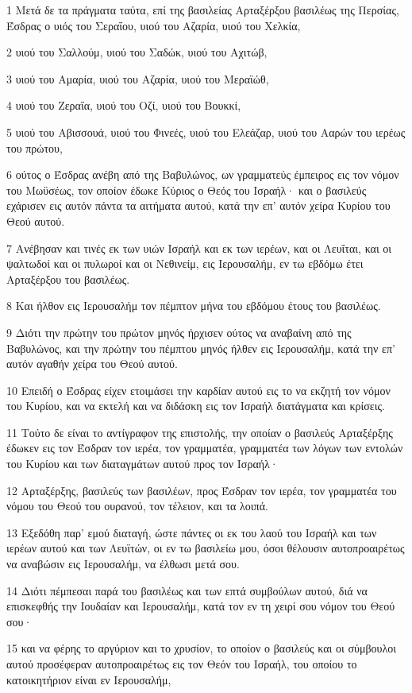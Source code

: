\par 1 Μετά δε τα πράγματα ταύτα, επί της βασιλείας Αρταξέρξου βασιλέως της Περσίας, Έσδρας ο υιός του Σεραΐου, υιού του Αζαρία, υιού του Χελκία,
\par 2 υιού του Σαλλούμ, υιού του Σαδώκ, υιού του Αχιτώβ,
\par 3 υιού του Αμαρία, υιού του Αζαρία, υιού του Μεραϊώθ,
\par 4 υιού του Ζεραΐα, υιού του Οζί, υιού του Βουκκί,
\par 5 υιού του Αβισσουά, υιού του Φινεές, υιού του Ελεάζαρ, υιού του Ααρών του ιερέως του πρώτου,
\par 6 ούτος ο Έσδρας ανέβη από της Βαβυλώνος, ων γραμματεύς έμπειρος εις τον νόμον του Μωϋσέως, τον οποίον έδωκε Κύριος ο Θεός του Ισραήλ· και ο βασιλεύς εχάρισεν εις αυτόν πάντα τα αιτήματα αυτού, κατά την επ' αυτόν χείρα Κυρίου του Θεού αυτού.
\par 7 Ανέβησαν και τινές εκ των υιών Ισραήλ και εκ των ιερέων, και οι Λευΐται, και οι ψαλτωδοί και οι πυλωροί και οι Νεθινείμ, εις Ιερουσαλήμ, εν τω εβδόμω έτει Αρταξέρξου του βασιλέως.
\par 8 Και ήλθον εις Ιερουσαλήμ τον πέμπτον μήνα του εβδόμου έτους του βασιλέως.
\par 9 Διότι την πρώτην του πρώτον μηνός ήρχισεν ούτος να αναβαίνη από της Βαβυλώνος, και την πρώτην του πέμπτου μηνός ήλθεν εις Ιερουσαλήμ, κατά την επ' αυτόν αγαθήν χείρα του Θεού αυτού.
\par 10 Επειδή ο Έσδρας είχεν ετοιμάσει την καρδίαν αυτού εις το να εκζητή τον νόμον του Κυρίου, και να εκτελή και να διδάσκη εις τον Ισραήλ διατάγματα και κρίσεις.
\par 11 Τούτο δε είναι το αντίγραφον της επιστολής, την οποίαν ο βασιλεύς Αρταξέρξης έδωκεν εις τον Έσδραν τον ιερέα, τον γραμματέα, γραμματέα των λόγων των εντολών του Κυρίου και των διαταγμάτων αυτού προς τον Ισραήλ·
\par 12 Αρταξέρξης, βασιλεύς των βασιλέων, προς Έσδραν τον ιερέα, τον γραμματέα του νόμου του Θεού του ουρανού, τον τέλειον, και τα λοιπά.
\par 13 Εξεδόθη παρ' εμού διαταγή, ώστε πάντες οι εκ του λαού του Ισραήλ και των ιερέων αυτού και των Λευϊτών, οι εν τω βασιλείω μου, όσοι θέλουσιν αυτοπροαιρέτως να αναβώσιν εις Ιερουσαλήμ, να έλθωσι μετά σου.
\par 14 Διότι πέμπεσαι παρά του βασιλέως και των επτά συμβούλων αυτού, διά να επισκεφθής την Ιουδαίαν και Ιερουσαλήμ, κατά τον εν τη χειρί σου νόμον του Θεού σου·
\par 15 και να φέρης το αργύριον και το χρυσίον, το οποίον ο βασιλεύς και οι σύμβουλοι αυτού προσέφεραν αυτοπροαιρέτως εις τον Θεόν του Ισραήλ, του οποίου το κατοικητήριον είναι εν Ιερουσαλήμ,
